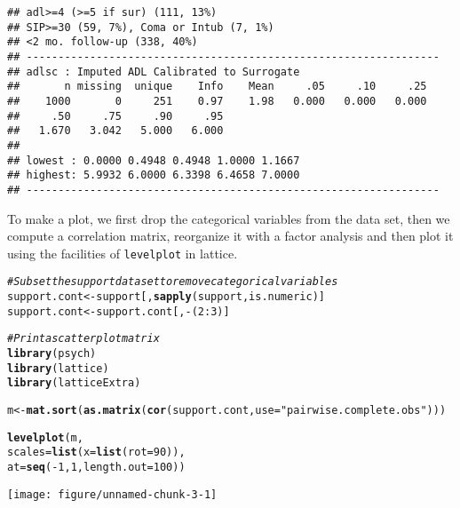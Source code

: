 \documentclass[headinclude=false]{scrartcl}\usepackage[]{graphicx}\usepackage[]{color}
\makeatletter
\def\maxwidth{ %
  \ifdim\Gin@nat@width>\linewidth
    \linewidth
  \else
    \Gin@nat@width
  \fi
}
\newcommand{\hlnum}[1]{\textcolor[rgb]{0.686,0.059,0.569}{#1}}%
\newcommand{\hlstr}[1]{\textcolor[rgb]{0.192,0.494,0.8}{#1}}%
\newcommand{\hlcom}[1]{\textcolor[rgb]{0.678,0.584,0.686}{\textit{#1}}}%
\newcommand{\hlopt}[1]{\textcolor[rgb]{0,0,0}{#1}}%
\newcommand{\hlstd}[1]{\textcolor[rgb]{0.345,0.345,0.345}{#1}}%
\newcommand{\hlkwb}[1]{\textcolor[rgb]{0.69,0.353,0.396}{#1}}%
\newcommand{\hlkwc}[1]{\textcolor[rgb]{0.333,0.667,0.333}{#1}}%
\newcommand{\hlkwd}[1]{\textcolor[rgb]{0.737,0.353,0.396}{\textbf{#1}}}%
\newenvironment{kframe}{%
 \def\at@end@of@kframe{}%
 \ifinner\ifhmode%
  \def\at@end@of@kframe{\end{minipage}}%
  \begin{minipage}{\columnwidth}%
 \fi\fi%
 \def\FrameCommand##1{\hskip\@totalleftmargin \hskip-\fboxsep
 \colorbox{shadecolor}{##1}\hskip-\fboxsep
     \hskip-\linewidth \hskip-\@totalleftmargin \hskip\columnwidth}%
 \MakeFramed {\advance\hsize-\width
   \@totalleftmargin\z@ \linewidth\hsize
   \@setminipage}}%
 {\par\unskip\endMakeFramed%
 \at@end@of@kframe}
\newenvironment{knitrout}{}{} %
\makeatother
\begin{document}
\begin{knitrout}
\begin{kframe}
\begin{verbatim}
## adl>=4 (>=5 if sur) (111, 13%) 
## SIP>=30 (59, 7%), Coma or Intub (7, 1%) 
## <2 mo. follow-up (338, 40%) 
## -----------------------------------------------------------------
## adlsc : Imputed ADL Calibrated to Surrogate 
##       n missing  unique    Info    Mean     .05     .10     .25 
##    1000       0     251    0.97    1.98   0.000   0.000   0.000 
##     .50     .75     .90     .95 
##   1.670   3.042   5.000   6.000 
## 
## lowest : 0.0000 0.4948 0.4948 1.0000 1.1667
## highest: 5.9932 6.0000 6.3398 6.4658 7.0000 
## -----------------------------------------------------------------
\end{verbatim}
\end{kframe}
\end{knitrout}

To make a plot, we first drop the categorical variables from the data set, then
we compute a correlation matrix, reorganize it with a factor
analysis and then plot it using the facilities of \texttt{levelplot} in
lattice.

\begin{knitrout}
\color{fgcolor}\begin{kframe}
\begin{alltt}
\hlcom{# Subset the support data set to remove categorical variables}
\hlstd{support.cont} \hlkwb{<-} \hlstd{support[,} \hlkwd{sapply}\hlstd{(support, is.numeric)]}
\hlstd{support.cont} \hlkwb{<-} \hlstd{support.cont[,} \hlopt{-}\hlstd{(}\hlnum{2}\hlopt{:}\hlnum{3}\hlstd{)]}

\hlcom{# Print a scatterplot matrix}
\hlkwd{library}\hlstd{(psych)}
\hlkwd{library}\hlstd{(lattice)}
\hlkwd{library}\hlstd{(latticeExtra)}

\hlstd{m} \hlkwb{<-} \hlkwd{mat.sort}\hlstd{(}\hlkwd{as.matrix}\hlstd{(}\hlkwd{cor}\hlstd{(support.cont,} \hlkwc{use} \hlstd{=} \hlstr{"pairwise.complete.obs"}\hlstd{)))}

\hlkwd{levelplot}\hlstd{(m,}
          \hlkwc{scales} \hlstd{=} \hlkwd{list}\hlstd{(}\hlkwc{x} \hlstd{=} \hlkwd{list}\hlstd{(}\hlkwc{rot} \hlstd{=} \hlnum{90}\hlstd{)),}
          \hlkwc{at} \hlstd{=} \hlkwd{seq}\hlstd{(}\hlopt{-}\hlnum{1}\hlstd{,} \hlnum{1}\hlstd{,} \hlkwc{length.out} \hlstd{=} \hlnum{100}\hlstd{))}
\end{alltt}
\end{kframe}

{\centering \texttt{[image: figure/unnamed-chunk-3-1]} 

}



\end{knitrout}
\end{document}
